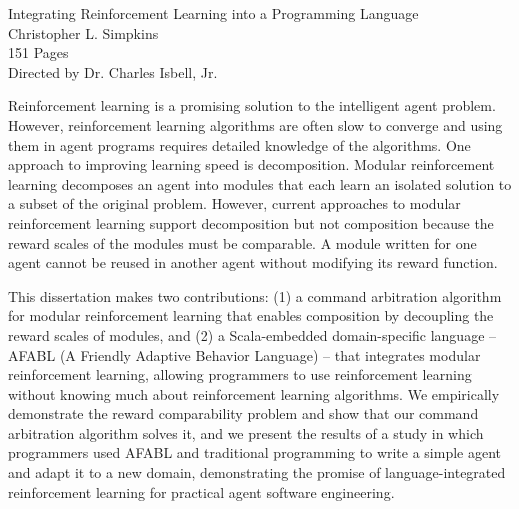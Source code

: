 \documentclass[12pt]{article}
\begin{document}
\begin{center}
  Integrating Reinforcement Learning into a Programming Language\\
  Christopher L. Simpkins\\
  151 Pages\\
  Directed by Dr. Charles Isbell, Jr.
\end{center}

Reinforcement learning is a promising solution to the intelligent agent problem. However, reinforcement learning algorithms are often slow to converge and using them in agent programs requires detailed knowledge of the algorithms. One approach to improving learning speed is decomposition. Modular reinforcement learning decomposes an agent into modules that each learn an isolated solution to a subset of the original problem. However, current approaches to modular reinforcement learning support decomposition but not composition because the reward scales of the modules must be comparable. A module written for one agent cannot be reused in another agent without modifying its reward function.

This dissertation makes two contributions: (1) a command arbitration algorithm for modular reinforcement learning that enables composition by decoupling the reward scales of modules, and (2) a Scala-embedded domain-specific language -- AFABL (A Friendly Adaptive Behavior Language) -- that integrates modular reinforcement learning, allowing programmers to use reinforcement learning without knowing much about reinforcement learning algorithms. We empirically demonstrate the reward comparability problem and show that our command arbitration algorithm solves it, and we present the results of a study in which programmers used AFABL and traditional programming to write a simple agent and adapt it to a new domain, demonstrating the promise of language-integrated reinforcement learning for practical agent software engineering.
\end{document}
